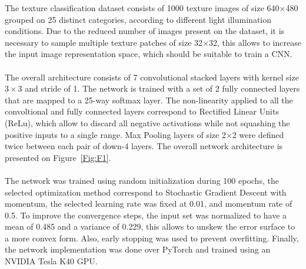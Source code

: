 \documentclass[10pt,twocolumn,letterpaper]{article}
\begin{document}
\begin{figure*}[t]
	\centering
	\caption{Graphical description of the proposed convolutional neural network architecture}
	\label{Fig:F1}
\end{figure*}


The texture classification dataset consists of 1000 texture images of size 640$\times$480 grouped on 25 distinct categories, according to different light illumination conditions. Due to the reduced number of images present on the dataset, it is necessary to sample multiple texture patches of size 32$\times$32, this allows to increase the input image representation space, which should be suitable to train a CNN. 
\\
\\
The overall architecture consists of 7 convolutional stacked layers with kernel size $3\times3$ and stride of 1. The network is trained with a set of 2 fully connected layers that are mapped to a 25-way softmax layer. The non-linearity applied to all the convoltional and fully connected layers correspond to Rectified Linear Units (ReLu), which allow to discard all negative activations while not squashing the positive inputs to a single range. Max Pooling layers of size 2$\times$2 were defined twice between each pair of down-4 layers. The overall network architecture is presented on Figure~\ref{Fig:F1}.
\\
\\
The network was trained using random initialization during 100 epochs, the selected optimization method correspond to Stochastic Gradient Descent with momentum, the selected learning rate was fixed at \num{0.01}, and momentum rate of 0.5. To improve the convergence steps, the input set was normalized to have a mean of 0.485 and a variance of 0.229, this allows to unskew the error surface to a more convex form. Also, early stopping was used to prevent overfitting. Finally, the network implementation was done over PyTorch and trained using an NVIDIA Tesla K40 GPU.

\end{document}
